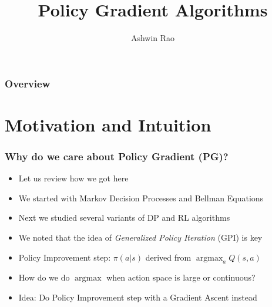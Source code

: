 \documentclass[handout]{beamer}
\title[Policy Gradient Algorithms]{Policy Gradient Algorithms} %
\author{Ashwin Rao} %
\institute[Stanford] %
{ICME, Stanford University
}
\date{} %
\DeclareMathOperator*{\argmax}{argmax}
\begin{document}
\begin{frame}
\titlepage %
\end{frame}

\begin{frame}
\frametitle{Overview} %
\tableofcontents %
\end{frame}

\section{Motivation and Intuition}


\begin{frame}
\frametitle{Why do we care about Policy Gradient (PG)?}
\pause
\begin{itemize}[<+->]
\item Let us review how we got here
\item We started with Markov Decision Processes and Bellman Equations
\item Next we studied several variants of DP and RL algorithms
\item We noted that the idea of {\em Generalized Policy Iteration} (GPI) is key
\item Policy Improvement step: $\pi(a|s)$ derived from $\argmax_a Q(s, a)$
\item How do we do $\argmax$ when action space is large or continuous?
\item Idea: Do Policy Improvement step with a Gradient Ascent instead
\end{itemize}
\end{frame}
\end{document}
